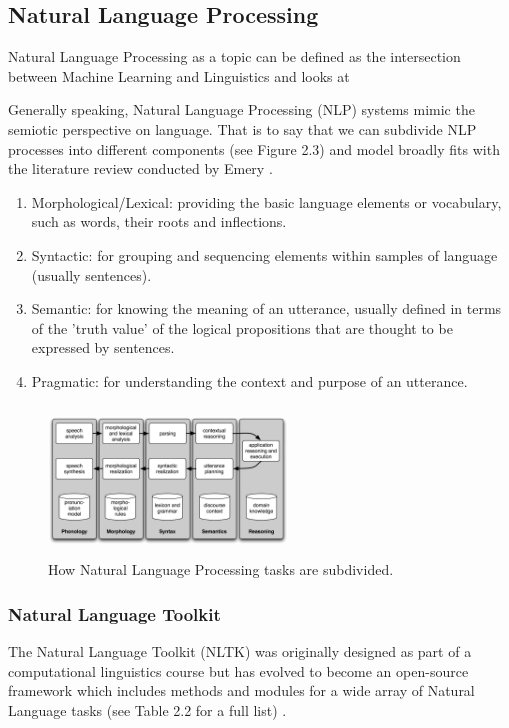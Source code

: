 \documentclass[10pt, letterpaper, twoside, openany]{book}
\begin{document}
\subsection{Natural Language Processing}
Natural Language Processing as a topic can be defined as the intersection between Machine Learning and Linguistics and looks at 


Generally speaking, Natural Language Processing (NLP) systems mimic the semiotic perspective on language. That is to say that we can subdivide NLP processes into different components (see Figure 2.3) and model broadly fits with the literature review conducted by Emery \cite{Emery2000}.
\begin{enumerate}
	\item Morphological/Lexical: providing the basic language elements or vocabulary, such as words, their roots and inflections.
	\item Syntactic: for grouping and sequencing elements within samples of language (usually sentences).
	\item Semantic: for knowing the meaning of an utterance, usually defined in terms of the 'truth value' of the logical propositions that are thought to be expressed by sentences.
	\item Pragmatic: for understanding the context and purpose of an utterance.
\end{enumerate}
\begin{figure}[H]
\centering
\includegraphics[width=240px, height=150px]{images/workflow.jpg}
\caption{How Natural Language Processing tasks are subdivided.\label{white}}
\end{figure}

\subsubsection{Natural Language Toolkit}
The Natural Language Toolkit (NLTK) was originally designed as part of a computational linguistics course but has evolved to become an open-source framework which includes methods and modules for a wide array of Natural Language tasks (see Table 2.2 for a full list) \cite{Bird2009}.
\end{document}
